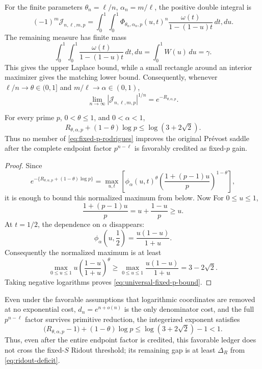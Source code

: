 For the finite parameters \(\theta_n=\ell/n\),
\(\alpha_n=m/\ell\), the positive double integral is
\[
 (-1)^m\mathcal J_{n,\ell,m,p}
 =\int_0^1\!\int_0^1
 \Phi_{\theta_n,\alpha_n,p}(u,t)^n
 \frac{\omega(t)}{1-(1-u)t}\,dt,du.
\]
The remaining measure has finite mass
\[
 \int_0^1\!\int_0^1
 \frac{\omega(t)}{1-(1-u)t}\,dt,du
 =\int_0^1W(u)\,du=\gamma.
\]
This gives the upper Laplace bound, while a small rectangle around an
interior maximizer gives the matching lower bound.  Consequently,
whenever \(\ell/n\to\theta\in(0,1]\) and
\(m/\ell\to\alpha\in(0,1)\),
\begin{equation}\label{eq:fixed-p-laplace}
 \lim_{n\to\infty}|\mathcal J_{n,\ell,m,p}|^{1/n}
 =e^{-R_{\theta,\alpha,p}}.
\end{equation}

\begin{theorem}
\label{thm:universal-fixed-p-cancellation}
For every prime \(p\), \(0<\theta\le1\), and \(0<\alpha<1\),
\begin{equation}\label{eq:universal-fixed-p-bound}
 \boxed{\displaystyle
 R_{\theta,\alpha,p}+(1-\theta)\log p
 \le\log(3+2\sqrt2).}
\end{equation}
Thus no member of \eqref{eq:fixed-p-rodrigues} improves the original
Pr\'evost saddle after the complete endpoint factor
\(p^{n-\ell}\) is favorably credited as fixed-\(p\) gain.
\end{theorem}

\begin{proof}
Since
\[
 e^{-\{R_{\theta,\alpha,p}+(1-\theta)\log p\}}
 =\max_{u,t}
 \left[
  \phi_\alpha(u,t)^\theta
  \left(\frac{1+(p-1)u}{p}\right)^{1-\theta}
 \right],
\]
it is enough to bound this normalized maximum from below.  Now
For \(0\le u\le1\),
\[
 \frac{1+(p-1)u}{p}=u+\frac{1-u}{p}\ge u.
\]
At \(t=1/2\), the dependence on \(\alpha\) disappears:
\[
 \phi_\alpha\!\left(u,\frac12\right)
 =\frac{u(1-u)}{1+u}.
\]
Consequently the normalized maximum is at least
\[
 \max_{0\le u\le1}
 u\left(\frac{1-u}{1+u}\right)^\theta
 \ge\max_{0\le u\le1}\frac{u(1-u)}{1+u}
 =3-2\sqrt2.
\]
Taking negative logarithms proves \eqref{eq:universal-fixed-p-bound}.
\end{proof}

\begin{corollary}
\label{cor:fixed-p-deficit}
Even under the favorable assumptions that logarithmic coordinates are
removed at no exponential cost, \(d_n=e^{n+o(n)}\) is the only denominator
cost, and the full \(p^{n-\ell}\) factor survives primitive reduction, the
integerized exponent satisfies
\[
 \bigl(R_{\theta,\alpha,p}-1\bigr)+(1-\theta)\log p
 \le\log(3+2\sqrt2)-1<1.
\]
Thus, even after the entire endpoint factor is credited, this favorable
ledger does not cross the fixed-\(S\) Ridout threshold; its remaining gap is
at least \(\Delta_R\) from \eqref{eq:ridout-deficit}.
\end{corollary}

